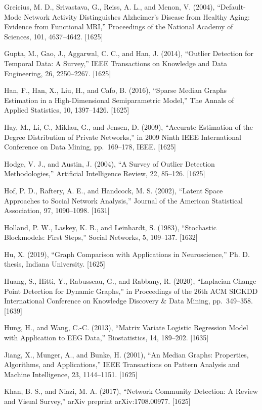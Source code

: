 \documentclass[
  10
]{article}
\begin{document}
Greicius, M. D., Srivastava, G., Reiss, A. L., and Menon, V. (2004),
``Default-Mode Network Activity Distinguishes Alzheimer's Disease from
Healthy Aging: Evidence from Functional MRI,'' Proceedings of the
National Academy of Sciences, 101, 4637--4642. {[}1625{]}

Gupta, M., Gao, J., Aggarwal, C. C., and Han, J. (2014), ``Outlier
Detection for Temporal Data: A Survey,'' IEEE Transactions on Knowledge
and Data Engineering, 26, 2250--2267. {[}1625{]}

Han, F., Han, X., Liu, H., and Cafo, B. (2016), ``Sparse Median Graphs
Estimation in a High-Dimensional Semiparametric Model,'' The Annals of
Applied Statistics, 10, 1397--1426. {[}1625{]}

Hay, M., Li, C., Miklau, G., and Jensen, D. (2009), ``Accurate
Estimation of the Degree Distribution of Private Networks,'' in 2009
Ninth IEEE International Conference on Data Mining, pp.~169--178, IEEE.
{[}1625{]}

Hodge, V. J., and Austin, J. (2004), ``A Survey of Outlier Detection
Methodologies,'' Artificial Intelligence Review, 22, 85--126. {[}1625{]}

Hof, P. D., Raftery, A. E., and Handcock, M. S. (2002), ``Latent Space
Approaches to Social Network Analysis,'' Journal of the American
Statistical Association, 97, 1090--1098. {[}1631{]}

Holland, P. W., Laskey, K. B., and Leinhardt, S. (1983), ``Stochastic
Blockmodels: First Steps,'' Social Networks, 5, 109--137. {[}1632{]}

Hu, X. (2019), ``Graph Comparison with Applications in Neuroscience,''
Ph. D. thesis, Indiana University. {[}1625{]}

Huang, S., Hitti, Y., Rabusseau, G., and Rabbany, R. (2020), ``Laplacian
Change Point Detection for Dynamic Graphs,'' in Proceedings of the 26th
ACM SIGKDD International Conference on Knowledge Discovery \& Data
Mining, pp.~349--358. {[}1639{]}

Hung, H., and Wang, C.-C. (2013), ``Matrix Variate Logistic Regression
Model with Application to EEG Data,'' Biostatistics, 14, 189--202.
{[}1635{]}

Jiang, X., Munger, A., and Bunke, H. (2001), ``An Median Graphs:
Properties, Algorithms, and Applications,'' IEEE Transactions on Pattern
Analysis and Machine Intelligence, 23, 1144--1151. {[}1625{]}

Khan, B. S., and Niazi, M. A. (2017), ``Network Community Detection: A
Review and Visual Survey,'' arXiv preprint arXiv:1708.00977. {[}1625{]}
\end{document}
